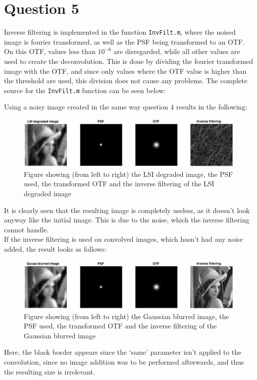 \documentclass[a4paper]{article}
\begin{document}
\section*{Question 5}
Inverse filtering is implemented in the function \texttt{InvFilt.m}, where the noised image is fourier transformed, as well as the PSF being transformed to an OTF. On this OTF, values less than  $10^{-6}$ are disregarded, while all other values are used to create the deconvolution. This is done by dividing the fourier transformed image with the OTF, and since only values where the OTF value is higher than the threshold are used, this division does not cause any problems. The complete
source for the \texttt{InvFilt.m} function can be seen below:

Using a noisy image created in the same way question 4 results in the following:
\begin{figure}[H]
  \centering
  \captionsetup{justification=centering}
\includegraphics[width=\textwidth]{q5_2.eps}
\caption{Figure showing (from left to right) the LSI degraded image, the PSF used, the transformed OTF and the inverse filtering of the LSI degraded image}
  \label{q5_1}
\end{figure}
It is clearly seen that the resulting image is completely useless, as it doesn’t look anyway like the initial image. This is due to the noise, which the inverse filtering cannot handle.\\

If the inverse filtering is used on convolved images, which hasn’t had any noise added, the  result looks as follows:
\begin{figure}[H]
  \centering
  \captionsetup{justification=centering}
\includegraphics[width=\textwidth]{q5_1.eps}
\caption{Figure showing (from left to right) the Gaussian blurred image, the PSF used, the transformed OTF and the inverse filtering of the Gaussian blurred image}
  \label{q5_2}
\end{figure}
Here, the black border appears since the ‘same’ parameter isn’t applied to the convolution, since no image addition was to be performed afterwards, and thus the resulting size is irrelevant.
\end{document}
